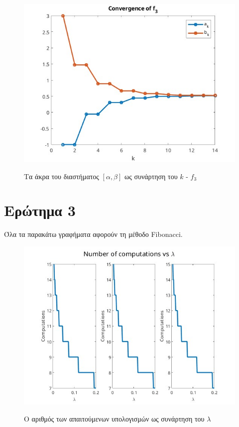 \begin{figure}[H]
    \includegraphics[scale=0.7]{plots/ex2/f3.jpg}
    \label{fig:funcs}
    \caption{Τα άκρα του διαστήματος $[\alpha, \beta]$ ως συνάρτηση του $k$ - $f_3$}
    \centering
\end{figure}

\section{Ερώτημα 3}

Όλα τα παρακάτω γραφήματα αφορούν τη μέθοδο Fibonacci.

\begin{figure}[H]
    \includegraphics[scale=0.7]{plots/ex3/l_comps.jpg}
    \label{fig:funcs}
    \caption{Ο αριθμός των απαιτούμενων υπολογισμών ως συνάρτηση του $\lambda$}
    \centering
\end{figure}


